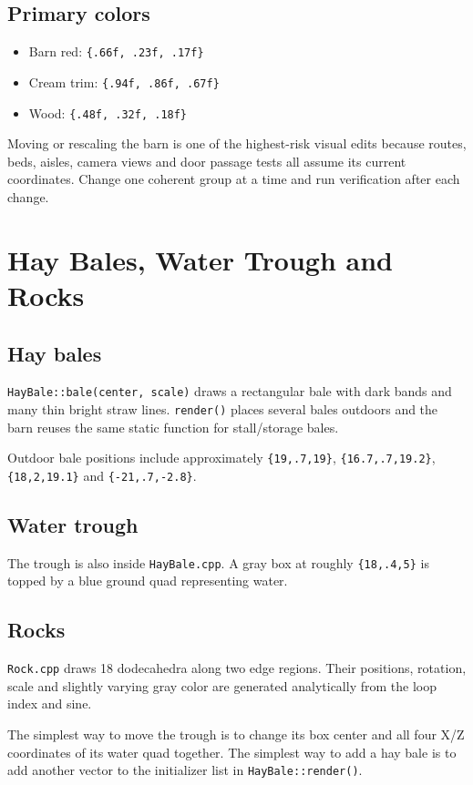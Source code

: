 \documentclass[11pt,a4paper,openany]{book}
\newcommand{\code}[1]{\texttt{#1}}
\newcommand{\file}[1]{\nolinkurl{#1}}
\newcommand{\rgb}[3]{\code{\{#1, #2, #3\}}}
\begin{document}
\section{Primary colors}
\begin{itemize}
	\item Barn red: \rgb{.66f}{.23f}{.17f}
	\item Cream trim: \rgb{.94f}{.86f}{.67f}
	\item Wood: \rgb{.48f}{.32f}{.18f}
\end{itemize}

\begin{warningbox}
	Moving or rescaling the barn is one of the highest-risk visual edits because routes, beds, aisles, camera views and door passage tests all assume its current coordinates. Change one coherent group at a time and run verification after each change.
\end{warningbox}

\chapter{Hay Bales, Water Trough and Rocks}
\section{Hay bales}
\code{HayBale::bale(center, scale)} draws a rectangular bale with dark bands and many thin bright straw lines. \code{render()} places several bales outdoors and the barn reuses the same static function for stall/storage bales.

Outdoor bale positions include approximately \code{\{19,.7,19\}}, \code{\{16.7,.7,19.2\}}, \code{\{18,2,19.1\}} and \code{\{-21,.7,-2.8\}}.

\section{Water trough}
The trough is also inside \file{HayBale.cpp}. A gray box at roughly \code{\{18,.4,5\}} is topped by a blue ground quad representing water.

\section{Rocks}
\file{Rock.cpp} draws 18 dodecahedra along two edge regions. Their positions, rotation, scale and slightly varying gray color are generated analytically from the loop index and sine.

\begin{editbox}
	The simplest way to move the trough is to change its box center and all four X/Z coordinates of its water quad together. The simplest way to add a hay bale is to add another vector to the initializer list in \code{HayBale::render()}.
\end{editbox}
\end{document}
